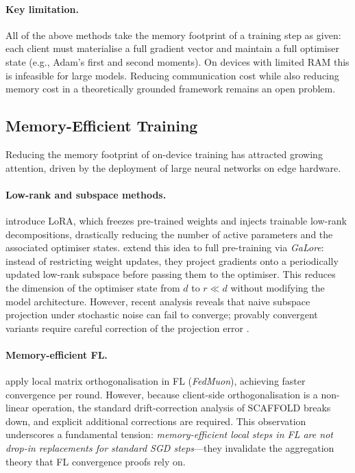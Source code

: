 \paragraph{Key limitation.}
All of the above methods take the memory footprint of a training step
as given: each client must materialise a full gradient vector and
maintain a full optimiser state (e.g., Adam's first and second
moments).  On devices with limited RAM this is infeasible for large
models.  Reducing communication cost while also reducing memory cost
in a theoretically grounded framework remains an open problem.

\subsection{Memory-Efficient Training}
\label{subsec:memory}

Reducing the memory footprint of on-device training has attracted
growing attention, driven by the deployment of large neural networks
on edge hardware.

\paragraph{Low-rank and subspace methods.}
\citet{hu2022lora} introduce LoRA, which freezes pre-trained weights
and injects trainable low-rank decompositions, drastically reducing
the number of active parameters and the associated optimiser states.
\citet{zhao2024galore} extend this idea to full pre-training via
\emph{GaLore}: instead of restricting weight updates, they project
gradients onto a periodically updated low-rank subspace before
passing them to the optimiser.  This reduces the dimension of the
optimiser state from $d$ to $r \ll d$ without modifying the model
architecture.  However, recent analysis reveals that naive subspace
projection under stochastic noise can fail to converge; provably
convergent variants require careful correction of the projection
error \citep{li2023analysis}.

\paragraph{Memory-efficient FL.}
\citet{liu2025fedmuon} apply local matrix orthogonalisation in FL
(\emph{FedMuon}), achieving faster convergence per round.  However,
because client-side orthogonalisation is a non-linear operation, the
standard drift-correction analysis of SCAFFOLD breaks down, and
explicit additional corrections are required.  This observation
underscores a fundamental tension: \emph{memory-efficient local steps
in FL are not drop-in replacements for standard SGD steps}—they
invalidate the aggregation theory that FL convergence proofs rely on.

